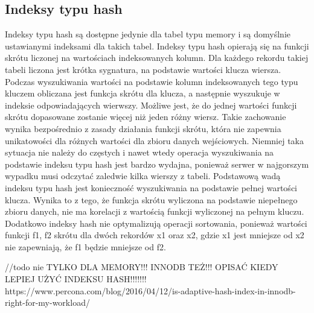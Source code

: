 
\subsection{Indeksy typu hash}
Indeksy typu hash są dostępne jedynie dla tabel typu memory i są domyślnie ustawianymi indeksami dla takich tabel. Indeksy typu hash opierają się na funkcji skrótu liczonej na wartościach indeksowanych kolumn. Dla każdego rekordu takiej tabeli liczona jest krótka sygnatura, na podstawie wartości klucza wiersza. Podczas wyszukiwania wartości na podstawie kolumn indeksowanych tego typu kluczem obliczana jest funkcja skrótu dla klucza, a następnie wyszukuje w indeksie odpowiadających wierwszy. Możliwe jest, że do jednej wartości funkcji skrótu dopasowane zostanie więcej niż jeden różny wiersz. Takie zachowanie wynika bezpośrednio z zasady działania funkcji skrótu, która nie zapewnia unikatowości dla różnych wartości dla zbioru danych wejściowych. Niemniej taka sytuacja nie należy do częstych i nawet wtedy operacja wyszukiwania na podstawie indeksu typu hash jest bardzo wydajna, ponieważ serwer w najgorszym wypadku musi odczytać zaledwie kilka wierszy z tabeli. Podstawową wadą indeksu typu hash jest konieczność wyszukiwania na podstawie pełnej wartości klucza. Wynika to z tego, że funkcja skrótu wyliczona na podstawie niepełnego zbioru danych, nie ma korelacji z wartością funkcji wyliczonej na pełnym kluczu. Dodatkowo indeksy hash nie optymalizują operacji sortowania, ponieważ wartości funkcji f1, f2 skrótu dla dwóch rekordów x1 oraz x2, gdzie x1 jest mniejsze od x2 nie zapewniają, że f1 będzie mniejsze od f2.

//todo nie TYLKO DLA MEMORY!!! INNODB TEŻ!!!
OPISAĆ KIEDY LEPIEJ UŻYĆ INDEKSU HASH!!!!!!!
https://www.percona.com/blog/2016/04/12/is-adaptive-hash-index-in-innodb-right-for-my-workload/